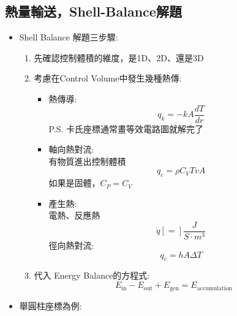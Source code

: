 \documentclass[../main.tex]{subfiles}
\begin{document}
\subsection{熱量輸送，Shell-Balance解題}
\begin{itemize}
  \item Shell Balance 解題三步驟:
  \begin{enumerate}
    \item 先確認控制體積的維度，是1D、2D、還是3D
    \item 考慮在Control Volume中發生幾種熱傳:
    \begin{itemize}
      \item 熱傳導:
      \begin{equation}
        q_k = -kA\frac{dT}{dr}
      \end{equation}
      P.S. 卡氏座標通常畫等效電路圖就解完了
      \item 軸向熱對流:\\
      有物質進出控制體積
      \begin{equation}
        q_c = \rho C_V T v A
      \end{equation}
      如果是固體，$C_P=C_V$
      \item 產生熱:\\
      電熱、反應熱
      \begin{equation}
        \dot q  [=] \frac{J}{S\cdot m^3}
      \end{equation}
      徑向熱對流:
      \begin{equation}
        q_c = h A\Delta T
      \end{equation}
    \end{itemize}
    \item 代入 Energy Balance的方程式:
    \begin{equation}
      E_\text{in} - E_{\text{out}} + E_{\text{gen}} = E_{\text{accumulation}}
    \end{equation}
  \end{enumerate}
  \item 舉圓柱座標為例:
  \begin{figure}[H]
    \centering
\end{figure}
\end{itemize}
\end{document}
